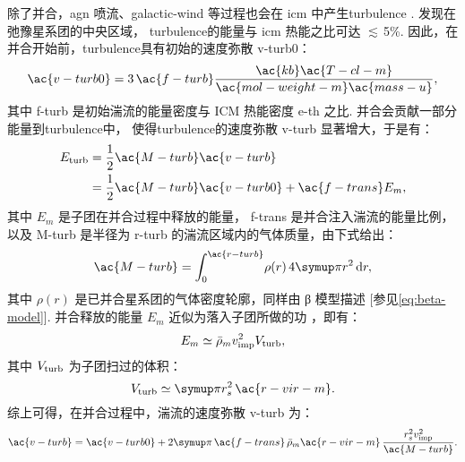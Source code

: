 除了并合，\ac{agn} 喷流、\ac{galactic-wind} 等过程也会在 \ac{icm}
中产生\ac{turbulence} \cite{vazza2011}.
 发现在弛豫星系团的中央区域，
\ac{turbulence}的能量与 \ac{icm} 热能之比可达 $\lesssim\,$5\%.
因此，在并合开始前，\ac{turbulence}具有初始的速度弥散 \ac{v-turb0}：
\begin{equation}
  \label{eq:v-turb0}
  \ac{v-turb0}
    = 3 \,\ac{f-turb} \frac{\ac{kb} \ac{T-cl-m}}{
        \ac{mol-weight-m} \ac{mass-u}} ,
\end{equation}
其中
\ac{f-turb} 是初始湍流的能量密度与 ICM 热能密度 \ac{e-th} 之比.
并合会贡献一部分能量到\ac{turbulence}中，
使得\ac{turbulence}的速度弥散 \ac{v-turb} 显著增大，于是有：
\begin{align}
  \label{eq:energy-turb}
  E_{\R{turb}}
    & = \frac{1}{2} \ac{M-turb} \ac{v-turb}  \\
    & = \frac{1}{2} \ac{M-turb} \ac{v-turb0} + \ac{f-trans} E_m ,
\end{align}
其中
$E_m$ 是子团在并合过程中释放的能量，
\ac{f-trans} 是并合注入湍流的能量比例，
以及 \ac{M-turb} 是半径为 \ac{r-turb} 的湍流区域内的气体质量，由下式给出：
\begin{equation}
  \ac{M-turb} = \int_0^{\ac{r-turb}} \! \rho(r) \,4\Cpi r^2 \,\D{r} ,
\end{equation}
其中 $\rho(r)$ 是已并合星系团的气体密度轮廓，同样由 β 模型描述
[参见\autoref{eq:beta-model}].
并合释放的能量 $E_m$ 近似为落入子团所做的功 \cite{fujita2003,cassano2005}，即有：
\begin{equation}
  \label{eq:energy-inj}
  E_m \simeq \bar{\rho}_m v_{\mathrm{imp}}^2 V_{\mathrm{turb}} ,
\end{equation}
其中 $V_{\mathrm{turb}}$ 为子团扫过的体积：
\begin{equation}
  V_{\R{turb}} \simeq \Cpi r_s^2 \,\ac{r-vir-m} .
\end{equation}
综上可得，在并合过程中，湍流的速度弥散 \ac{v-turb} 为：
\begin{equation}
  \ac{v-turb}
    = \ac{v-turb0}
    + 2 \Cpi\,\ac{f-trans}\, \bar{\rho}_m \ac{r-vir-m}
      \,\frac{r_s^2 v_{\R{imp}}^2}{\ac{M-turb}} .
\end{equation}

